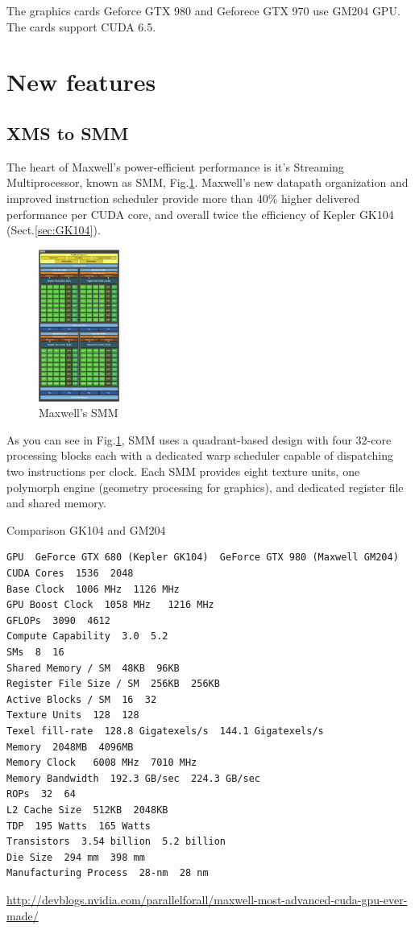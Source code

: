 The graphics cards Geforce GTX 980 and Geforece GTX 970 use GM204 GPU.
The cards support CUDA 6.5. 
 
\section{New features}

\subsection{XMS to SMM}
\label{sec:SMM}

The heart of Maxwell's power-efficient performance is it's Streaming
Multiprocessor, known as SMM, Fig.\ref{fig:Maxwell_SMM}. Maxwell's new datapath
organization and improved instruction scheduler provide more than 40\% higher
delivered performance per CUDA core, and overall twice the efficiency of Kepler
GK104 (Sect.\ref{sec:GK104}).

\begin{figure}[hbt]
  \centerline{\includegraphics[height=5cm,
    angle=0]{./images/Maxwell_SMM.eps}}
  \caption{Maxwell's SMM}
  \label{fig:Maxwell_SMM}
\end{figure}
 
As you can see in Fig.\ref{fig:Maxwell_SMM}, SMM uses a quadrant-based design
with four 32-core processing blocks each with a dedicated warp scheduler capable
of dispatching two instructions per clock. Each SMM provides eight texture
units, one polymorph engine (geometry processing for graphics), and dedicated
register file and shared memory.   

Comparison GK104 and GM204
\begin{Verbatim}
GPU  GeForce GTX 680 (Kepler GK104)  GeForce GTX 980 (Maxwell GM204)
CUDA Cores  1536  2048
Base Clock  1006 MHz  1126 MHz
GPU Boost Clock  1058 MHz   1216 MHz
GFLOPs  3090  4612
Compute Capability  3.0  5.2
SMs  8  16
Shared Memory / SM  48KB  96KB
Register File Size / SM  256KB  256KB
Active Blocks / SM  16  32
Texture Units  128  128
Texel fill-rate  128.8 Gigatexels/s  144.1 Gigatexels/s
Memory  2048MB  4096MB
Memory Clock   6008 MHz  7010 MHz
Memory Bandwidth  192.3 GB/sec  224.3 GB/sec
ROPs  32  64
L2 Cache Size  512KB  2048KB
TDP  195 Watts  165 Watts
Transistors  3.54 billion  5.2 billion
Die Size  294 mm  398 mm
Manufacturing Process  28-nm  28 nm
\end{Verbatim}
\url{http://devblogs.nvidia.com/parallelforall/maxwell-most-advanced-cuda-gpu-ever-made/}

